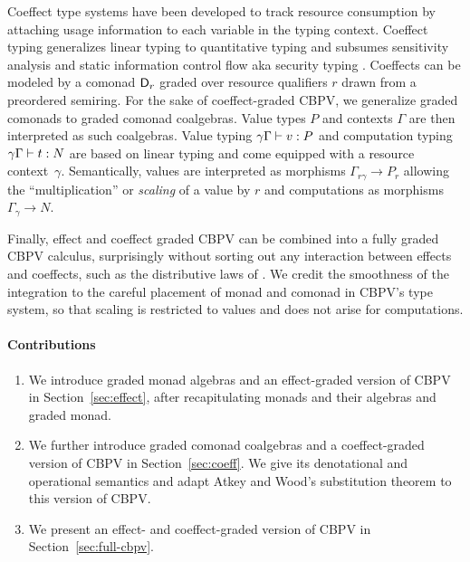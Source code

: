 \documentclass[acmsmall,review,anonymous]{acmart}\settopmatter{printfolios=true,printccs=false,printacmref=false}
\theoremstyle{remark}
\begin{document}
Coeffect type systems
\citep{brunel:esop14,orchard:icfp14,ghicaSmith:esop14} have been
developed to track resource consumption by attaching usage information
to each variable in the typing context.  Coeffect typing generalizes
linear typing \citep{girard:linear} to quantitative typing
\citep{sergeyVytiniotisPeytonJones:popl14,mcBride:wadler60,atkey:lics18}
and subsumes sensitivity analysis \citep{reedPierce:icfp10} and static
information control flow \citep{volpano:jcs96} aka security typing
\citep{abadiBanerjeeHeintzeRiecke:popl99}.
Coeffects can be modeled by a comonad $\D[r]$ graded over resource
qualifiers $r$ drawn from a preordered semiring.  For the sake of
coeffect-graded CBPV, we generalize graded comonads to graded comonad
coalgebras.  Value types $P$ and contexts $\Gamma$ are then
interpreted as such coalgebras.  Value typing
$\qValTy \gamma \Gamma v P$ and computation typing
$\qCompTy \gamma \Gamma t N$ are based on linear typing and come
equipped with a resource context~$\gamma$.  Semantically, values are
interpreted as morphisms $\Gamma_{r\gamma} \to P_r$ allowing the
``multiplication'' or \emph{scaling} of a value by $r$ %
and computations as morphisms $\Gamma_\gamma \to N$.

Finally, effect and coeffect graded CBPV can be combined into a fully
graded CBPV calculus, surprisingly without sorting out any interaction
between effects and coeffects, such as the distributive laws of
\citet{orchard:icfp16}.  We credit the smoothness of the integration
to the careful placement of monad and comonad in CBPV's type system,
so that scaling is restricted to values and does not arise for computations.

\paragraph*{Contributions}
\begin{enumerate}

\item We introduce graded monad algebras and an effect-graded version
  of CBPV in Section~\ref{sec:effect}, after recapitulating monads and
  their algebras and graded monad.

\item We further introduce graded comonad coalgebras and a
  coeffect-graded version of CBPV in Section~\ref{sec:coeff}.  We give
  its denotational and operational semantics and adapt Atkey and
  Wood's substitution theorem
  \citeyearpar{atkeyWood:types19,woodAtkey:linearity20} to this
  version of CBPV.

\item We present an effect- and coeffect-graded version of CBPV in Section~\ref{sec:full-cbpv}.

\end{enumerate}
\end{document}
